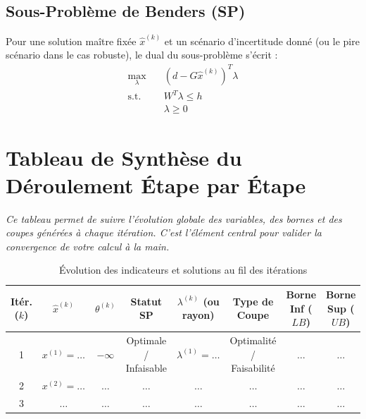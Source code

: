 \documentclass[11pt,a4paper]{article}
\begin{document}
\subsection{Sous-Problème de Benders (SP)}
Pour une solution maître fixée $\hat{x}^{(k)}$ et un scénario d'incertitude donné (ou le pire scénario dans le cas robuste), le dual du sous-problème s'écrit :
\begin{equation}
    \begin{aligned}
        \max_{\lambda} \quad & (d - G\hat{x}^{(k)})^T \lambda \\
        \text{s.t.} \quad & W^T \lambda \le h \\
        & \lambda \ge 0
    \end{aligned}
\end{equation}

\vspace{0.3cm}

\section{Tableau de Synthèse du Déroulement Étape par Étape}
\label{sec:tableau_synthese}
\textit{Ce tableau permet de suivre l'évolution globale des variables, des bornes et des coupes générées à chaque itération. C'est l'élément central pour valider la convergence de votre calcul à la main.}

\begin{table}[h!]
    \centering
    \caption{Évolution des indicateurs et solutions au fil des itérations}
    \label{tab:benders_iterations}
    \small
    \begin{tabular}{cccccccc}
        \toprule
        \textbf{Itér. ($k$)} & $\hat{x}^{(k)}$ & $\theta^{(k)}$ & \textbf{Statut SP} & $\lambda^{(k)}$ (ou rayon) & \textbf{Type de Coupe} & \textbf{Borne Inf ($LB$)} & \textbf{Borne Sup ($UB$)} \\
        \midrule
        1 & $x^{(1)} = \dots$ & $-\infty$ & Optimale / Infaisable & $\lambda^{(1)} = \dots$ & Optimalité / Faisabilité & $\dots$ & $\dots$ \\
        2 & $x^{(2)} = \dots$ & $\dots$ & $\dots$ & $\dots$ & $\dots$ & $\dots$ & $\dots$ \\
        3 & $\dots$ & $\dots$ & $\dots$ & $\dots$ & $\dots$ & $\dots$ & $\dots$ \\
        \bottomrule
    \end{tabular}
\end{table}
\end{document}

